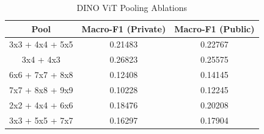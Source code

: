 \documentclass[conference]{IEEEtran}
\begin{document}
\begin{table}[H]
\centering
\caption{DINO ViT Pooling Ablations}
\label{tab:dino_pool_all}
\begin{tabular}{@{}ccc@{}}
\toprule
\textbf{Pool}   & \textbf{Macro-F1 (Private)} & \textbf{Macro-F1 (Public)} \\ \midrule
3x3 + 4x4 + 5x5 & 0.21483                     & 0.22767                    \\
3x4 + 4x3       & 0.26823                     & 0.25575                    \\
6x6 + 7x7 + 8x8 & 0.12408                     & 0.14145                    \\
7x7 + 8x8 + 9x9 & 0.10228                     & 0.12245                    \\
2x2 + 4x4 + 6x6 & 0.18476                     & 0.20208                    \\
3x3 + 5x5 + 7x7 & 0.16297                     & 0.17904                    \\ \bottomrule
\end{tabular}
\end{table}
\end{document}
